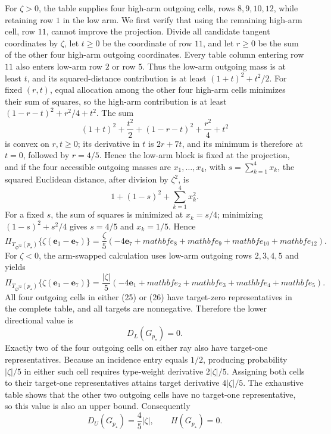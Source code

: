 For \(\zeta>0\), the table supplies four high-arm outgoing cells, rows \(8,9,10,12\), while retaining row \(1\) in the low arm.  We first verify that using the remaining high-arm cell, row \(11\), cannot improve the projection.  Divide all candidate tangent coordinates by \(\zeta\), let \(t\geq0\) be the coordinate of row \(11\), and let \(r\geq0\) be the sum of the other four high-arm outgoing coordinates.  Every table column entering row \(11\) also enters low-arm row \(2\) or row \(5\).  Thus the low-arm outgoing mass is at least \(t\), and its squared-distance contribution is at least \((1+t)^2+t^2/2\).  For fixed \((r,t)\), equal allocation among the other four high-arm cells minimizes their sum of squares, so the high-arm contribution is at least \((1-r-t)^2+r^2/4+t^2\).  The sum
\[
(1+t)^2+\frac{t^2}{2}+(1-r-t)^2+\frac{r^2}{4}+t^2
\]
is convex on \(r,t\geq0\); its derivative in \(t\) is \(2r+7t\), and its minimum is therefore at \(t=0\), followed by \(r=4/5\).  Hence the low-arm block is fixed at the projection, and if the four accessible outgoing masses are \(x_1,\ldots,x_4\), with \(s=\sum_{k=1}^4x_k\), the squared Euclidean distance, after division by \(\zeta^2\), is
\[
1+(1-s)^2+\sum_{k=1}^4x_k^2.
\]
For a fixed \(s\), the sum of squares is minimized at \(x_k=s/4\); minimizing \((1-s)^2+s^2/4\) gives \(s=4/5\) and \(x_k=1/5\).  Hence
\[
\Pi_{T_{\mathfrak O^{32}}(p_\star)}
\{\zeta(\mathbf e_1-\mathbf e_7)\}
=\frac{\zeta}{5}(-4\mathbf e_7+mathbf e_8+mathbf e_9+mathbf e_{10}+mathbf e_{12}).
\tag{25}
\]
For \(\zeta<0\), the arm-swapped calculation uses low-arm outgoing rows \(2,3,4,5\) and yields
\[
\Pi_{T_{\mathfrak O^{32}}(p_\star)}
\{\zeta(\mathbf e_1-\mathbf e_7)\}
=\frac{|\zeta|}{5}(-4\mathbf e_1+mathbf e_2+mathbf e_3+mathbf e_4+mathbf e_5).
\tag{26}
\]
All four outgoing cells in either (25) or (26) have target-zero representatives in the complete table, and all targets are nonnegative.  Therefore the lower directional value is
\[
D_L(G_{p_\star})=0.
\tag{27}
\]
Exactly two of the four outgoing cells on either ray also have target-one representatives.  Because an incidence entry equals \(1/2\), producing probability \(|\zeta|/5\) in either such cell requires type-weight derivative \(2|\zeta|/5\).  Assigning both cells to their target-one representatives attains target derivative \(4|\zeta|/5\).  The exhaustive table shows that the other two outgoing cells have no target-one representative, so this value is also an upper bound.  Consequently
\[
D_U(G_{p_\star})=\frac45|\zeta|,
\qquad H(G_{p_\star})=0.
\tag{28}
\]

